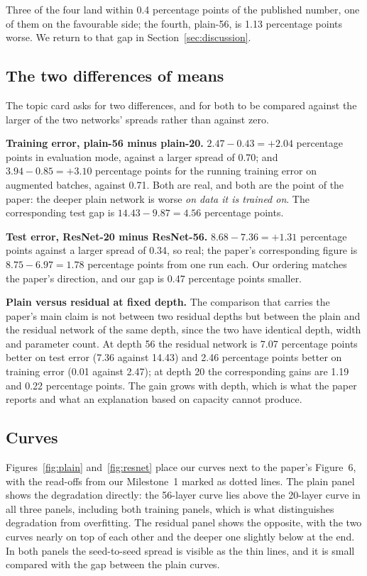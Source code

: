 \documentclass[11pt,a4paper]{article}
\newcommand{\pp}{percentage points}
\begin{document}
Three of the four land within 0.4 \pp{} of the published number, one of them on
the favourable side; the fourth, plain-56, is 1.13 \pp{} worse. We return to
that gap in Section~\ref{sec:discussion}.

\subsection{The two differences of means}

The topic card asks for two differences, and for both to be compared against
the larger of the two networks' spreads rather than against zero.

\textbf{Training error, plain-56 minus plain-20.} $2.47 - 0.43 = +2.04$ \pp{}
in evaluation mode, against a larger spread of 0.70; and $3.94 - 0.85 = +3.10$
\pp{} for the running training error on augmented batches, against 0.71. Both
are real, and both are the point of the paper: the deeper plain network is
worse \emph{on data it is trained on}. The corresponding test gap is
$14.43 - 9.87 = 4.56$ \pp.

\textbf{Test error, ResNet-20 minus ResNet-56.} $8.68 - 7.36 = +1.31$ \pp{}
against a larger spread of 0.34, so real; the paper's corresponding figure is
$8.75 - 6.97 = 1.78$ \pp{} from one run each. Our ordering matches the paper's
direction, and our gap is 0.47 \pp{} smaller.

\textbf{Plain versus residual at fixed depth.} The comparison that carries the
paper's main claim is not between two residual depths but between the plain and
the residual network of the same depth, since the two have identical depth,
width and parameter count. At depth 56 the residual network is 7.07 \pp{}
better on test error (7.36 against 14.43) and 2.46 \pp{} better on training
error (0.01 against 2.47); at depth 20 the corresponding gains are 1.19 and
0.22 \pp{}. The gain grows with depth, which is what the paper reports and what
an explanation based on capacity cannot produce.

\subsection{Curves}

Figures~\ref{fig:plain} and~\ref{fig:resnet} place our curves next to the
paper's Figure~6, with the read-offs from our Milestone~1 marked as dotted
lines. The plain panel shows the degradation directly: the 56-layer curve lies
above the 20-layer curve in all three panels, including both training panels,
which is what distinguishes degradation from overfitting. The residual panel
shows the opposite, with the two curves nearly on top of each other and the
deeper one slightly below at the end. In both panels the seed-to-seed spread is
visible as the thin lines, and it is small compared with the gap between the
plain curves.
\end{document}
